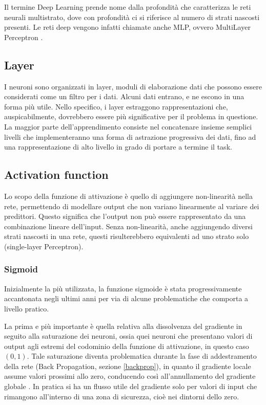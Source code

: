 Il termine Deep Learning prende nome dalla profondità che caratterizza le reti neurali multistrato, dove con profondità ci si riferisce al numero di strati nascosti presenti. Le reti deep vengono infatti chiamate anche MLP, ovvero MultiLayer Perceptron \cite{goodfellow2016deep}.


\subsection{Layer}
I neuroni sono organizzati in layer, moduli di elaborazione dati che possono essere considerati come un filtro per i dati. Alcuni dati entrano, e ne escono in una forma più utile. Nello specifico, i layer estraggono rappresentazioni che, auspicabilmente, dovrebbero essere più significative per il problema in questione. La maggior parte dell'apprendimento consiste nel concatenare insieme semplici livelli che implementeranno una forma di astrazione progressiva dei dati, fino ad una rappresentazione di alto livello in grado di portare a termine il task.

\subsection{Activation function}
Lo scopo della funzione di attivazione è quello di aggiungere non-linearità nella rete, permettendo di modellare output che non variano linearmente al variare dei predittori. Questo significa che l'output non può essere rappresentato da una combinazione lineare dell'input. Senza non-linearità, anche aggiungendo diversi strati nascosti in una rete, questi risulterebbero equivalenti ad uno strato solo (single-layer Perceptron).

\subsubsection{Sigmoid}
Inizialmente la più utilizzata, la funzione sigmoide è stata progressivamente accantonata negli ultimi anni per via di alcune problematiche che comporta a livello pratico.

La prima e più importante è quella relativa alla dissolvenza del gradiente in seguito alla saturazione dei neuroni, ossia quei neuroni che presentano valori di output agli estremi del codominio della funzione di attivazione, in questo caso $(0, 1)$. Tale saturazione diventa problematica durante la fase di addestramento della rete (Back Propagation, sezione \ref{backprop}), in quanto il gradiente locale assume valori prossimi allo zero, conducendo così all'annullamento del gradiente globale \cite{glorot2010understanding}. In pratica si ha un flusso utile del gradiente solo per valori di input che rimangono all'interno di una zona di sicurezza, cioè nei dintorni dello zero.

